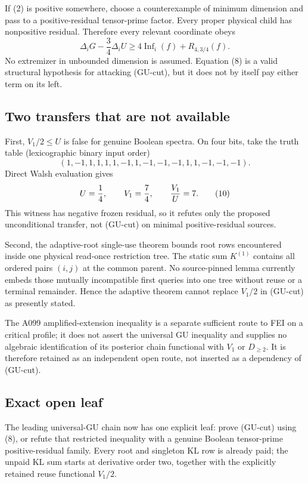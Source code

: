 If (2) is positive somewhere, choose a counterexample of minimum dimension
and pass to a positive-residual tensor-prime factor.  Every proper physical
child has nonpositive residual.  Therefore every relevant coordinate obeys
\[
 \Delta_iG-\frac34\Delta_iU
 \ge4\operatorname{Inf}_i(f)+R_{4,3/4}(f).
 \tag{8}
\]
No extremizer in unbounded dimension is assumed.  Equation (8) is a valid
structural hypothesis for attacking (GU-cut), but it does not by itself pay
either term on its left.

\subsection*{Two transfers that are not available}

First, \(V_1/2\le U\) is false for genuine Boolean spectra.  On four bits,
take the truth table (lexicographic binary input order)
\[
 (1,-1,1,1,1,1,-1,1,-1,-1,-1,1,1,-1,-1,-1).
 \tag{9}
\]
Direct Walsh evaluation gives
\[
 U={1\over4},\qquad V_1={7\over4},\qquad {V_1\over U}=7.
 \tag{10}
\]
This witness has negative frozen residual, so it refutes only the proposed
unconditional transfer, not (GU-cut) on minimal positive-residual sources.

Second, the adaptive-root single-use theorem bounds root rows encountered
inside one physical read-once restriction tree.  The static sum \(K^{(1)}\)
contains all ordered pairs \((i,j)\) at the common parent.  No source-pinned
lemma currently embeds those mutually incompatible first queries into one
tree without reuse or a terminal remainder.  Hence the adaptive theorem
cannot replace \(V_1/2\) in (GU-cut) as presently stated.

The A099 amplified-extension inequality is a separate sufficient route to
FEI on a critical profile; it does not assert the universal GU inequality
and supplies no algebraic identification of its posterior chain functional
with \(V_1\) or \(D_{\ge2}\).  It is therefore retained as an independent
open route, not inserted as a dependency of (GU-cut).

\subsection*{Exact open leaf}

The leading universal-GU chain now has one explicit leaf: prove (GU-cut)
using (8), or refute that restricted inequality with a genuine Boolean
tensor-prime positive-residual family.  Every root and singleton KL row is
already paid; the unpaid KL sum starts at derivative order two, together
with the explicitly retained reuse functional \(V_1/2\).
